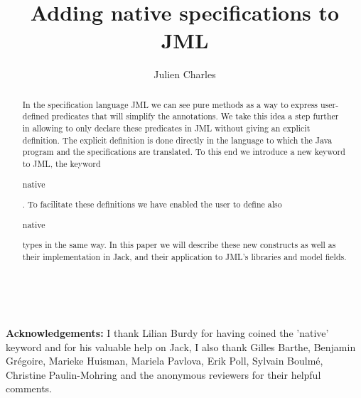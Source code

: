 \documentclass{llncs}
\newcommand{\code}[1]{\begin{tt}\begin{small}#1\end{small}\end{tt}}
\begin{document}
%
%
\pagestyle{headings}  %


%
\title{Adding native specifications to JML}

\author{Julien Charles }


\maketitle

\begin{abstract}
In the specification language JML we can see pure methods as a way to 
express user-defined predicates that will simplify the annotations. 
We take this idea a step further in allowing 
to only declare these predicates in JML without giving an explicit definition.
The explicit definition is done directly in the language
to which the Java program and the specifications are 
translated. To this end we introduce a new keyword to JML, the keyword 
\code{native}. 
To facilitate these definitions we have enabled the user to define 
also \code{native} types in the same way.
In this paper we will describe these new constructs as well as their 
implementation in Jack, 
 and their application to JML's libraries and model fields.
\end{abstract}
%







\ \\
\begin{small}
\begin{it}
{\bf Acknowledgements:} I thank Lilian Burdy for having coined the 'native'
 keyword and for his valuable help on Jack, 
I also thank Gilles Barthe, Benjamin Gr\'egoire, Marieke Huisman, 
Mariela Pavlova, Erik Poll,
Sylvain Boulm\'e,  Christine Paulin-Mohring and the anonymous
reviewers for their helpful comments.
\end{it}
\end{small} 

%
%


\end{document}
